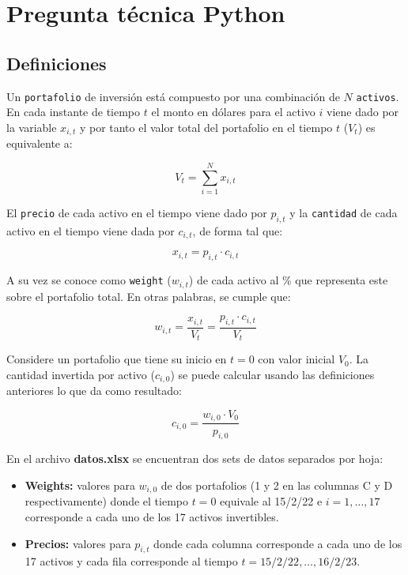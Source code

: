 \documentclass{article}
\newcommand{\keyword}[1]{\colorbox{gray!15}{\textcolor{red!70!black}{\texttt{#1}}}}
\begin{document}
\section*{Pregunta técnica Python}

\subsection*{Definiciones}

Un \keyword{portafolio} de inversión está compuesto por una combinación de $N$ \keyword{activos}. En cada instante de tiempo $t$ el monto en dólares para el activo $i$ viene dado por la variable $x_{i,t}$ y por tanto el valor total del portafolio en el tiempo $t$ ($V_t$) es equivalente a:

\[ V_t = \sum_{i=1}^{N} x_{i,t} \]

El \keyword{precio} de cada activo en el tiempo viene dado por $p_{i,t}$ y la \keyword{cantidad} de cada activo en el tiempo viene dada por $c_{i,t}$, de forma tal que:

\[ x_{i,t} = p_{i,t} \cdot c_{i,t} \]

A su vez se conoce como \keyword{weight} ($w_{i,t}$) de cada activo al \% que representa este sobre el portafolio total. En otras palabras, se cumple que:

\begin{equation}
    w_{i,t} = \frac{x_{i,t}}{V_t} = \frac{p_{i,t} \cdot c_{i,t}}{V_t}
\end{equation}

Considere un portafolio que tiene su inicio en $t = 0$ con valor inicial $V_0$. La cantidad invertida por activo ($c_{i,0}$) se puede calcular usando las definiciones anteriores lo que da como resultado:

\begin{equation}
    c_{i,0} = \frac{w_{i,0} \cdot V_0}{p_{i,0}}
\end{equation}

En el archivo \textbf{datos.xlsx} se encuentran dos sets de datos separados por hoja:
\begin{itemize}
    \item \textbf{Weights:} valores para $w_{i,0}$ de dos portafolios (1 y 2 en las columnas C y D respectivamente) donde el tiempo $t = 0$ equivale al 15/2/22 e $i = 1, \dots, 17$ corresponde a cada uno de los 17 activos invertibles.
    \item \textbf{Precios:} valores para $p_{i,t}$ donde cada columna corresponde a cada uno de los 17 activos y cada fila corresponde al tiempo $t = \text{15/2/22}, \dots, \text{16/2/23}$.
\end{itemize}
\end{document}
